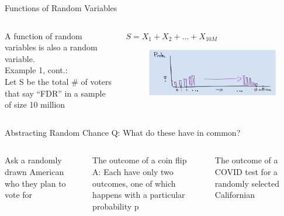\documentclass[aspectratio=169]{../latex_main/tntbeamer}  %
\begin{document}
	\begin{frame}[c]{Functions of Random Variables}
	    \begin{columns}
	        \begin{column}{.4\textwidth}
	            A function of random variables is also a random variable.\\
	            \bigskip
	            Example 1, cont.:\\
                Let S be the total # of voters that say “FDR” in a sample of size 10 million\\
	        \end{column}
	        
	        \begin{column}{.4\textwidth}
	           $S=X_1 + X_2 + ... + X_{10M}$
	           \begin{figure}
	               \centering
	               \includegraphics[scale=.5]{Bild16}
	           \end{figure}
	        \end{column}
	    \end{columns}
	\end{frame}
	
	
	
	\begin{frame}[c]{Abstracting Random Chance}
	    Q: What do these have in common?\\
	    \bigskip
	    \begin{columns}
	        \begin{column}{.3\textwidth}
	            Ask a randomly drawn American who they plan to vote for
	        \end{column}
	        
	        \begin{column}{.3\textwidth}
	          The outcome of a coin flip\\
	          \bigskip
	          A: Each have only two outcomes, one of which happens with a particular probability p

	        \end{column}
	        
	        \begin{column}{.3\textwidth}
	          The outcome of a COVID test for a randomly selected Californian

	        \end{column}
	    \end{columns}
	\end{frame}
	
\end{document}
